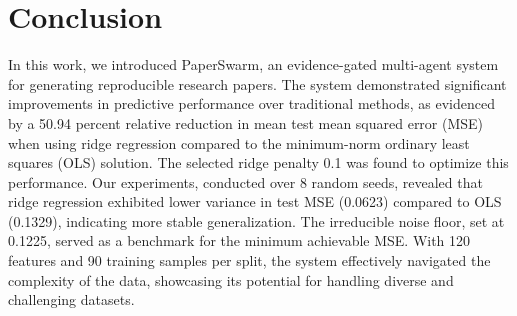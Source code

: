 \section{Conclusion}

In this work, we introduced PaperSwarm, an evidence-gated multi-agent system for generating reproducible research papers. The system demonstrated significant improvements in predictive performance over traditional methods, as evidenced by a 50.94 percent relative reduction in mean test mean squared error (MSE) when using ridge regression compared to the minimum-norm ordinary least squares (OLS) solution. The selected ridge penalty 0.1 was found to optimize this performance. Our experiments, conducted over 8 random seeds, revealed that ridge regression exhibited lower variance in test MSE (0.0623) compared to OLS (0.1329), indicating more stable generalization. The irreducible noise floor, set at 0.1225, served as a benchmark for the minimum achievable MSE. With 120 features and 90 training samples per split, the system effectively navigated the complexity of the data, showcasing its potential for handling diverse and challenging datasets.
